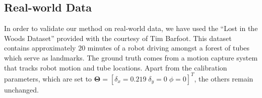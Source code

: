 




\subsection{Real-world Data}

In order to validate our method on real-world data, we have used the ``Lost in
the Woods Dataset'' provided with the courtesy of Tim Barfoot. This dataset
contains approximately $20$ minutes of a robot driving amongst a forest of
tubes which serve as landmarks. The ground truth comes from a motion capture
system that tracks robot motion and tube locations. Apart from the calibration
parameters, which are set to $\mathbf{\Theta}=[\delta_x=0.219\;\delta_y=0\;
\phi=0]^T$, the others remain unchanged.
